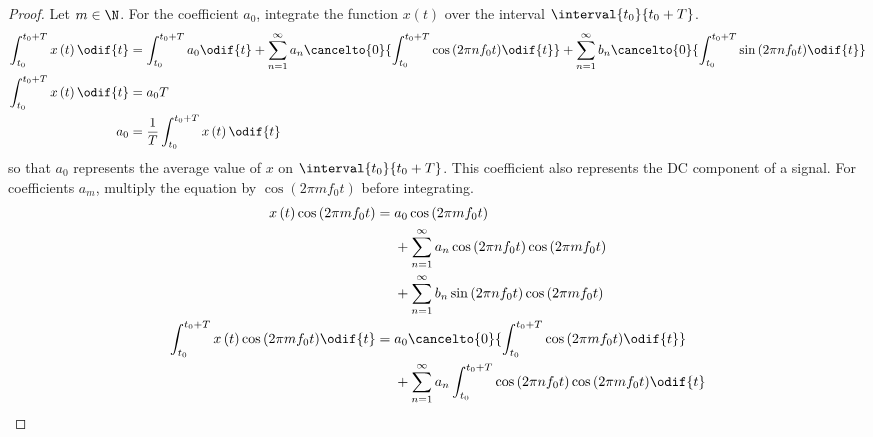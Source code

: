 \documentclass{article}
\begin{document}
\begin{proof}
    Let \(m \in \N\). For the coefficient \(a_0\), integrate the function \(x\left( t
    \right)\) over the interval \(\interval{t_0}{t_0 + T}\).
    \begin{align*}
        \int_{t_0}^{t_0 + T} x\left( t \right) \odif{t} & = \int_{t_0}^{t_0 + T} a_0 \odif{t} + \sum_{n = 1}^\infty a_n \cancelto{0}{\int_{t_0}^{t_0 + T} \cos{\left( 2 \pi n f_0 t \right)} \odif{t}} + \sum_{n = 1}^\infty b_n \cancelto{0}{\int_{t_0}^{t_0 + T} \sin{\left( 2 \pi n f_0 t \right)} \odif{t}} \\
        \int_{t_0}^{t_0 + T} x\left( t \right) \odif{t} & = a_0 T                                                                                                                                                                                                                                               \\
        a_0                                             & = \frac{1}{T} \int_{t_0}^{t_0 + T} x\left( t \right) \odif{t}
    \end{align*}
    so that \(a_0\) represents the average value of \(x\) on \(\interval{t_0}{t_0 + T}\). This coefficient also
    represents the DC component of a signal. For coefficients \(a_m\),
    multiply the equation by \(\cos{\left( 2 \pi m f_0 t \right)}\)
    before integrating.
    \begin{align*}
        x\left( t \right) \cos{\left( 2 \pi m f_0 t \right)}                               & =
        \begin{aligned}[t]
             & a_0 \cos{\left( 2 \pi m f_0 t \right)}                                                          \\
             & + \sum_{n = 1}^\infty a_n \cos{\left( 2 \pi n f_0 t \right)} \cos{\left( 2 \pi m f_0 t \right)} \\
             & + \sum_{n = 1}^\infty b_n \sin{\left( 2 \pi n f_0 t \right)} \cos{\left( 2 \pi m f_0 t \right)}
        \end{aligned}
        \\
        \int_{t_0}^{t_0 + T} x\left( t \right) \cos{\left( 2 \pi m f_0 t \right)} \odif{t} & =
        \begin{aligned}[t]
             & a_0 \cancelto{0}{\int_{t_0}^{t_0 + T} \cos{\left( 2 \pi m f_0 t \right)} \odif{t}}                                                          \\
             & + \sum_{n = 1}^\infty a_n \int_{t_0}^{t_0 + T} \cos{\left( 2 \pi n f_0 t \right)} \cos{\left( 2 \pi m f_0 t \right)} \odif{t}               \\

\end{aligned}
\end{align*}
\end{proof}
\end{document}

